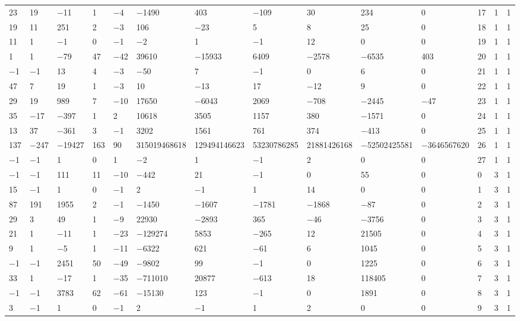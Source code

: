 \documentclass[pdftex]{sigma}
\numberwithin{equation}{section}
\theoremstyle{definition}
\numberwithin{table}{section}
\begin{document}
{\begin{paracol}{3}
\begin{supertabular}{|w{c}{.32cm}w{c}{.32cm}w{c}{.32cm}@{\hspace{.5cm}}w{c}{.2cm}w{c}{.2cm}|@{\hspace{\tabcolsep}}HHHHHHw{c}{.17cm}w{c}{.17cm}w{c}{.17cm}|}
			23 & 19 & $-$11 & 1 & $-$4 & $-$1490 & 403 & $-$109 & 30 & 234 & 0 & 17 & 1 & 1 \\
			19 & 11 & 251 & 2 & $-$3 & 106 & $-$23 & 5 & 8 & 25 & 0 & 18 & 1 & 1 \\
			11 & 1 & $-$1 & 0 & $-$1 & $-$2 & 1 & $-$1 & 12 & 0 & 0 & 19 & 1 & 1 \\
			1 & 1 & $-$79 & 47 & $-$42 & 39610 & $-$15933 & 6409 & $-$2578 & $-$6535 & 403 & 20 & 1 & 1 \\
			$-$1 & $-$1 & 13 & 4 & $-$3 & $-$50 & 7 & $-$1 & 0 & 6 & 0 & 21 & 1 & 1 \\
			47 & 7 & 19 & 1 & $-$3 & 10 & $-$13 & 17 & $-$12 & 9 & 0 & 22 & 1 & 1 \\
			29 & 19 & 989 & 7 & $-$10 & 17650 & $-$6043 & 2069 & $-$708 & $-$2445 & $-$47 & 23 & 1 & 1 \\
			35 & $-$17 & $-$397 & 1 & 2 & 10618 & 3505 & 1157 & 380 & $-$1571 & 0 & 24 & 1 & 1 \\
			13 & 37 & $-$361 & 3 & $-$1 & 3202 & 1561 & 761 & 374 & $-$413 & 0 & 25 & 1 & 1 \\
			137 & $-$247 & $-$19427 & 163 & 90 & 315019468618 & 129494146623 & 53230786285 & 21881426168 & $-$52502425581 & $-$3646567620 & 26 & 1 & 1 \\
			$-$1 & $-$1 & 1 & 0 & 1 & $-$2 & 1 & $-$1 & 2 & 0 & 0 & 27 & 1 & 1 \\
			$-$1 & $-$1 & 111 & 11 & $-$10 & $-$442 & 21 & $-$1 & 0 & 55 & 0 & 0 & 3 & 1 \\
			15 & $-$1 & 1 & 0 & $-$1 & 2 & $-$1 & 1 & 14 & 0 & 0 & 1 & 3 & 1 \\
			87 & 191 & 1955 & 2 & $-$1 & $-$1450 & $-$1607 & $-$1781 & $-$1868 & $-$87 & 0 & 2 & 3 & 1 \\
			29 & 3 & 49 & 1 & $-$9 & 22930 & $-$2893 & 365 & $-$46 & $-$3756 & 0 & 3 & 3 & 1 \\
			21 & 1 & $-$11 & 1 & $-$23 & $-$129274 & 5853 & $-$265 & 12 & 21505 & 0 & 4 & 3 & 1 \\
			9 & 1 & $-$5 & 1 & $-$11 & $-$6322 & 621 & $-$61 & 6 & 1045 & 0 & 5 & 3 & 1 \\
			$-$1 & $-$1 & 2451 & 50 & $-$49 & $-$9802 & 99 & $-$1 & 0 & 1225 & 0 & 6 & 3 & 1 \\
			33 & 1 & $-$17 & 1 & $-$35 & $-$711010 & 20877 & $-$613 & 18 & 118405 & 0 & 7 & 3 & 1 \\
			$-$1 & $-$1 & 3783 & 62 & $-$61 & $-$15130 & 123 & $-$1 & 0 & 1891 & 0 & 8 & 3 & 1 \\
			3 & $-$1 & 1 & 0 & $-$1 & 2 & $-$1 & 1 & 2 & 0 & 0 & 9 & 3 & 1 \\

\end{supertabular}
\end{paracol}}
\end{document}
